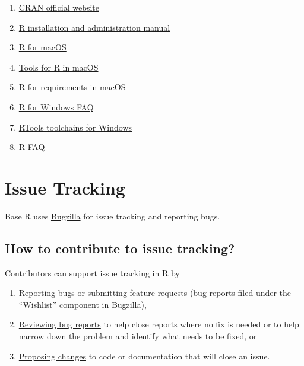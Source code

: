 \documentclass[
]{book}
\begin{document}
\begin{enumerate}
\def\labelenumi{\arabic{enumi}.}
\item
  \href{https://cran.r-project.org}{CRAN official website}
\item
  \href{https://cran.r-project.org/doc/manuals/r-patched/R-admin.html}{R installation and administration manual}
\item
  \href{https://mac.r-project.org/}{R for macOS}
\item
  \href{https://mac.r-project.org/tools/}{Tools for R in macOS}
\item
  \href{https://mac.r-project.org/src/}{R for requirements in macOS}
\item
  \href{https://cran.r-project.org/bin/windows/base/rw-FAQ.html}{R for Windows FAQ}
\item
  \href{https://cran.r-project.org/bin/windows/Rtools/}{RTools toolchains for Windows}
\item
  \href{https://cran.r-project.org/doc/FAQ/R-FAQ.html}{R FAQ}
\end{enumerate}

\chapter{Issue Tracking}\label{IssueTrack}

Base R uses \href{https://bugs.r-project.org/}{Bugzilla} for issue tracking and reporting bugs.

\section{How to contribute to issue tracking?}\label{how-to-contribute-to-issue-tracking}

Contributors can support issue tracking in R by

\begin{enumerate}
\def\labelenumi{\arabic{enumi}.}
\item
  \hyperref[ReportingBugs]{Reporting bugs} or \hyperref[FeatureRequests]{submitting feature requests} (bug reports filed under the ``Wishlist'' component in Bugzilla),
\item
  \href{https://contributor.r-project.org/rdevguide/ReviewBugs.html}{Reviewing bug reports} to help close reports where no fix is needed or to help narrow down the problem and identify what needs to be fixed, or
\item
  \href{https://contributor.r-project.org/rdevguide/FixBug.html\#FixBug}{Proposing changes} to code or documentation that will close an issue.
\end{enumerate}
\end{document}
